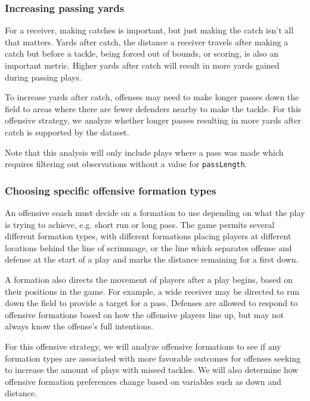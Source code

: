 \documentclass[bibtex, sigconf, hyperref={colorlinks=true,linkcolor=blue,urlcolor=blue}]{acmart}
\begin{document}
\subsubsection{Increasing passing yards}

For a receiver, making catches is important, but just making the catch isn't all
that matters. Yards after catch, the distance a receiver travels after making a
catch but before a tackle, being forced out of bounds, or scoring, is also an
important metric. Higher yards after catch will result in more yards gained
during passing plays.

To increase yards after catch, offenses may need to make longer passes down the
field to areas where there are fewer defenders nearby to make the tackle. For
this offensive strategy, we analyze whether longer passes resulting in more yards
after catch is supported by the dataset.

Note that this analysis will only include plays where a pass was made which
requires filtering out observations without a value for \texttt{passLength}.

\subsubsection{Choosing specific offensive formation types}

An offensive coach must decide on a formation to use depending on what the play
is trying to achieve, e.g. short run or long pass. The game permits several
different formation types, with different formations placing players at
different locations behind the line of scrimmage, or the line which separates
offense and defense at the start of a play and marks the distance remaining for
a first down.

A formation also directs the movement of players after a play begins, based on
their positions in the game. For example, a wide receiver may be directed to run
down the field to provide a target for a pass. Defenses are allowed to respond
to offensive formations based on how the offensive players line up, but may not
always know the offense's full intentions.

For this offensive strategy, we will analyze offensive formations to see if any
formation types are associated with more favorable outcomes for offenses seeking
to increase the amount of plays with missed tackles. We will also determine how
offensive formation preferences change based on variables such as down and
distance.
\end{document}
